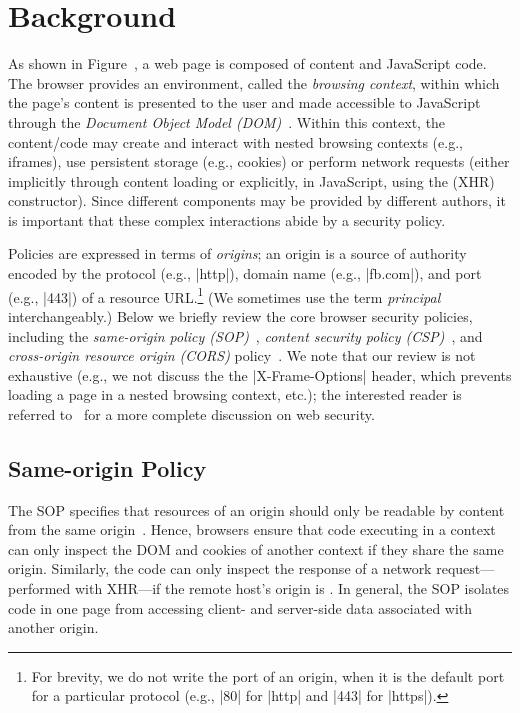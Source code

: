 \section{Background}
\label{sec:background}

%
As shown in Figure~, a web page is composed of
content and JavaScript code.
%
The browser provides an environment, called the \emph{browsing
context}, within which the page's content is presented to the user and
made accessible to JavaScript through the \emph{Document Object Model
(DOM)}~.
%
Within this context, the content/code may create and interact with
nested browsing contexts (e.g., iframes), use persistent storage
(e.g., cookies) or perform network requests (either implicitly through
content loading or explicitly, in JavaScript, using the \xhr{} (XHR)
constructor).
%
Since different components may be provided by different authors, it is
important that these complex interactions abide by a security policy.
 
Policies are expressed in terms of \emph{origins}; an origin is a
source of authority encoded by the protocol (e.g., \js|http|), domain
name (e.g., \js|fb.com|), and port (e.g., \js|443|) of a resource
URL.\footnote{
  For brevity, we do not write the port of an origin, when it is the
  default port for a particular protocol (e.g., \js|80| for \js|http|
  and \js|443| for \js|https|).
}
%
(We sometimes use the term \emph{principal} interchangeably.)
%
Below we briefly review the core browser security policies, including
the \emph{same-origin policy (SOP)}~\tocite{}, \emph{content security
policy (CSP)}~\tocite{}, and \emph{cross-origin resource origin
(CORS)} policy~\tocite{}.
%
%
We note that our review is not exhaustive (e.g., we not discuss the
the \js|X-Frame-Options| header, which prevents loading a page in a
nested browsing context, etc.);  the interested reader is referred
to~\tocite{} for a more complete discussion on web security.



\subsection{Same-origin Policy}
\label{sec:background:sop}

The SOP specifies that resources of an origin should only be readable
by content from the same origin~.
%
Hence, browsers ensure that code executing in a  context
can only inspect the DOM and cookies of another context if they share
the same origin.
%
Similarly, the code can only inspect the response of a network
request---performed with XHR---if the remote host's origin is
.
%
In general, the SOP isolates code in one page from accessing client-
and server-side data associated with another origin.
 
